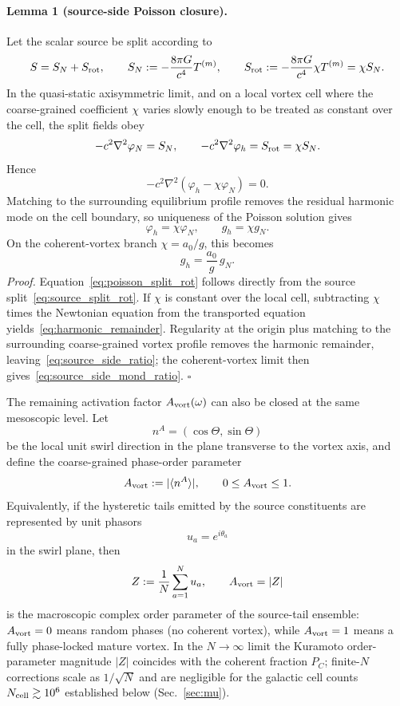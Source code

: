 \documentclass[11pt]{article}
\begin{document}
\paragraph{Lemma 1 (source-side Poisson closure).}
Let the scalar source be split according to
\begin{equation}
  S = S_N + S_{\rm rot},\qquad
  S_N := -\frac{8\pi G}{c^4}T^{(m)},\qquad
  S_{\rm rot} := -\frac{8\pi G}{c^4}\chi T^{(m)} = \chi S_N.
  \label{eq:source_split_rot}
\end{equation}
In the quasi-static axisymmetric limit, and on a local vortex cell where the
coarse-grained coefficient $\chi$ varies slowly enough to be treated as
constant over the cell, the split fields obey
\begin{equation}
  -c^2\nabla^2\varphi_N = S_N,\qquad
  -c^2\nabla^2\varphi_h = S_{\rm rot} = \chi S_N.
  \label{eq:poisson_split_rot}
\end{equation}
Hence
\begin{equation}
  -c^2\nabla^2\!\left(\varphi_h-\chi\varphi_N\right)=0.
  \label{eq:harmonic_remainder}
\end{equation}
Matching to the surrounding equilibrium profile removes the residual harmonic
mode on the cell boundary, so uniqueness of the Poisson solution gives
\begin{equation}
  \varphi_h=\chi\varphi_N,\qquad
  g_h=\chi g_N.
  \label{eq:source_side_ratio}
\end{equation}
On the coherent-vortex branch $\chi=a_0/g$, this becomes
\begin{equation}
  g_h=\frac{a_0}{g}\,g_N.
  \label{eq:source_side_mond_ratio}
\end{equation}
\textit{Proof.} Equation~\eqref{eq:poisson_split_rot} follows directly from the
source split~\eqref{eq:source_split_rot}.  If $\chi$ is constant over the local
cell, subtracting $\chi$ times the Newtonian equation from the transported
equation yields~\eqref{eq:harmonic_remainder}.  Regularity at the origin plus
matching to the surrounding coarse-grained vortex profile removes the harmonic
remainder, leaving~\eqref{eq:source_side_ratio}; the coherent-vortex limit then
gives~\eqref{eq:source_side_mond_ratio}. \hfill$\square$

The remaining activation factor $A_{\rm vort}(\omega)$ can also be closed at
the same mesoscopic level.  Let
\[
n^A=(\cos\Theta,\sin\Theta)
\]
be the local unit swirl direction in the plane transverse to the vortex axis,
and define the coarse-grained phase-order parameter
\[
A_{\rm vort}:=|\langle n^A\rangle|,\qquad 0\le A_{\rm vort}\le 1.
\]
Equivalently, if the hysteretic tails emitted by the source constituents are
represented by unit phasors
\[
u_a=e^{i\theta_a}
\]
in the swirl plane, then
\[
Z:=\frac{1}{N}\sum_{a=1}^N u_a,
\qquad
A_{\rm vort}=|Z|
\]
is the macroscopic complex order parameter of the source-tail ensemble:
$A_{\rm vort}=0$ means random phases (no coherent vortex), while
$A_{\rm vort}=1$ means a fully phase-locked mature vortex.
In the $N\to\infty$ limit the Kuramoto order-parameter magnitude
$|Z|$ coincides with the coherent fraction $P_C$; finite-$N$
corrections scale as $1/\sqrt{N}$ and are negligible for the
galactic cell counts $N_{\rm cell}\gtrsim 10^6$ established below
(Sec.~\ref{sec:mu}).
\end{document}
